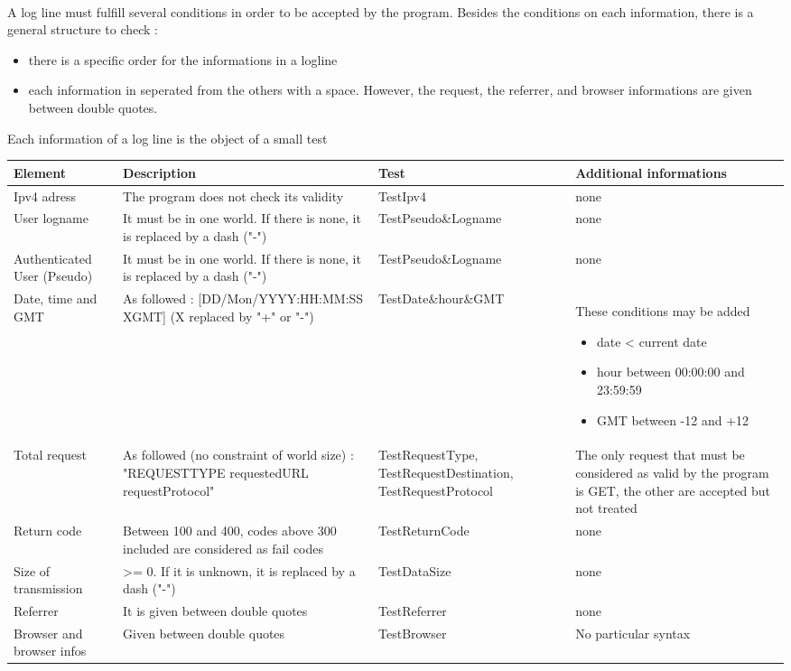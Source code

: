 \documentclass[a4paper, 12pts]{article}
\begin{document}
\paragraph{}
 A log line must fulfill several conditions in order to be accepted by the program. Besides the conditions on each information, there is a general structure to check :
 \begin{itemize}[label=$\square$]
 \item there is a specific order for the informations in a logline
 \item each information in seperated from the others with a space. However, the request, the referrer, and browser informations are given between double quotes.
 \end{itemize}
 Each information of a log line is the object of a small test
 \begin{center}
   \begin{tabular}{| p{2.5cm} | p{4.5cm} | p{3.3cm} | p{3.5cm} |}
     \hline
     Element & Description & Test & Additional informations\\ \hline
     Ipv4 adress & The program does not check its validity & TestIpv4 & none\\ \hline
     User logname & It must be in one world. If there is none, it is replaced by a dash ("-") & TestPseudo\&Logname & none\\ \hline
     Authenticated User (Pseudo) & It must be in one world. If there is none, it is replaced by a dash ("-") & TestPseudo\&Logname & none\\ \hline
     Date, time and GMT &  As followed : [DD/Mon/YYYY:HH:MM:SS XGMT] (X replaced by "+" or "-") & TestDate\&hour\&GMT & These conditions may be added
 \begin{itemize}
 \item date < current date
 \item hour between 00:00:00 and 23:59:59
 \item GMT between -12 and +12
 \end{itemize}\\ \hline
     Total request & As followed (no constraint of world size) : "REQUESTTYPE requestedURL requestProtocol" & TestRequestType, TestRequestDestination, TestRequestProtocol & The only request that must be considered as valid by the program is GET, the other are accepted but not treated\\ \hline
     Return code & Between 100 and 400, codes above 300 included are considered as fail codes & TestReturnCode & none\\ \hline
     Size of transmission & >= 0. If it is unknown, it is replaced by a dash ("-") & TestDataSize & none\\ \hline
     Referrer & It is given between double quotes & TestReferrer & none\\ \hline
     Browser and browser infos & Given between double quotes & TestBrowser & No particular syntax \\
     \hline
   \end{tabular}
 \end{center}
\end{document}

